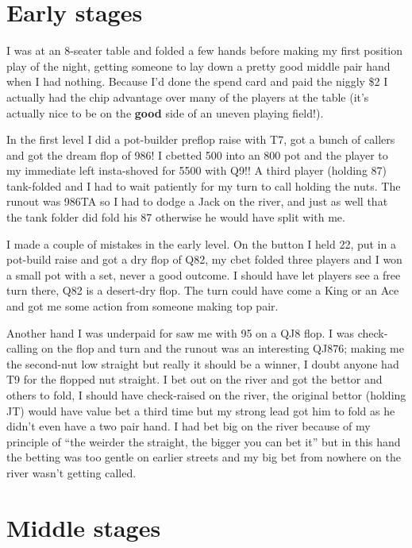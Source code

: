\section{Early stages}

I was at an 8-seater table and folded a few hands before
making my first position play of the night, getting someone
to lay down a pretty good middle pair hand when I had nothing.
Because I'd done the spend card and paid the niggly \$2 I actually
had the chip advantage over many of the players at the table
(it's actually nice to be on the \textbf{good} side of an
uneven playing field!).

In the first level I did a pot-builder preflop raise with T7,
got a bunch of callers and got the dream flop of 986! I cbetted
500 into an 800 pot and the player to my immediate left
insta-shoved for 5500 with Q9!! A third player (holding 87) tank-folded
and I had to wait patiently for my turn to call holding the nuts.
The runout was 986TA so I had to dodge a Jack on the river,
and just as well that the tank folder did fold his 87 otherwise he
would have split with me.

I made a couple of mistakes in the early level. On the button I held
22, put in a pot-build raise and got a dry flop of Q82, my cbet
folded three players and I won a small pot with a set, never a
good outcome. I should have let players see a free turn there, Q82
is a desert-dry flop. The turn could have come a King or an Ace and
got me some action from someone making top pair.

Another hand I was underpaid for saw me with 95 on a QJ8 flop. I was
check-calling on the flop and turn and the runout was an interesting
QJ876; making me the second-nut low straight but really it
should be a winner, I doubt anyone had T9 for the flopped nut straight.
I bet out on the river and got the bettor and others to fold, I should
have check-raised on the river, the original bettor (holding JT)
would have value bet a third time but my strong lead got him to fold
as he didn't even have a two pair hand. I had bet big on the river
because of my principle of ``the weirder the straight, the bigger you
can bet it'' but in this hand the betting was too gentle on earlier
streets and my big bet from nowhere on the river wasn't getting
called.

\section{Middle stages}

